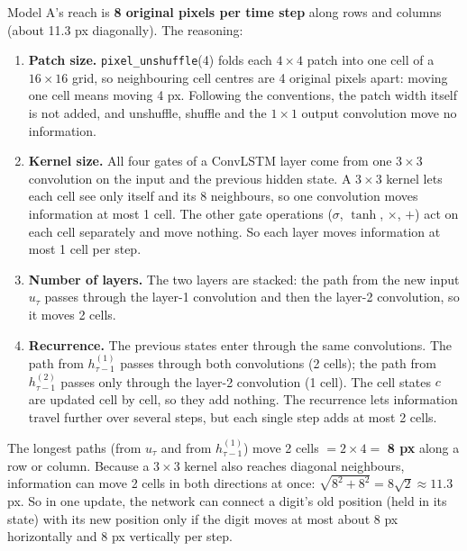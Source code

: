 Model A's reach is \textbf{8 original pixels per time step} along rows and columns (about 11.3 px diagonally). The reasoning:
\begin{enumerate}
\item \textbf{Patch size.} \texttt{pixel\_unshuffle}(4) folds each $4\times4$ patch into one cell of a $16\times16$ grid, so neighbouring cell centres are 4 original pixels apart: moving one cell means moving 4 px. Following the conventions, the patch width itself is not added, and unshuffle, shuffle and the $1\times1$ output convolution move no information.
\item \textbf{Kernel size.} All four gates of a ConvLSTM layer come from one $3\times3$ convolution on the input and the previous hidden state. A $3\times3$ kernel lets each cell see only itself and its 8 neighbours, so one convolution moves information at most 1 cell. The other gate operations ($\sigma$, $\tanh$, $\times$, $+$) act on each cell separately and move nothing. So each layer moves information at most 1 cell per step.
\item \textbf{Number of layers.} The two layers are stacked: the path from the new input $u_\tau$ passes through the layer-1 convolution and then the layer-2 convolution, so it moves 2 cells.
\item \textbf{Recurrence.} The previous states enter through the same convolutions. The path from $h^{(1)}_{\tau-1}$ passes through both convolutions (2 cells); the path from $h^{(2)}_{\tau-1}$ passes only through the layer-2 convolution (1 cell). The cell states $c$ are updated cell by cell, so they add nothing. The recurrence lets information travel further over several steps, but each single step adds at most 2 cells.
\end{enumerate}
The longest paths (from $u_\tau$ and from $h^{(1)}_{\tau-1}$) move 2 cells $=2\times4=$ \textbf{8 px} along a row or column. Because a $3\times3$ kernel also reaches diagonal neighbours, information can move 2 cells in both directions at once: $\sqrt{8^2+8^2}=8\sqrt2\approx11.3$ px. So in one update, the network can connect a digit's old position (held in its state) with its new position only if the digit moves at most about 8 px horizontally and 8 px vertically per step.

